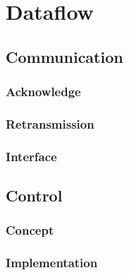 %
%
\chapter{Dataflow} \label{chapt:dataflow}

\section{Communication}

\subsection{Acknowledge}

\subsection{Retransmission}

\subsection{Interface}

\section{Control}

\subsection{Concept}

\subsection{Implementation}

